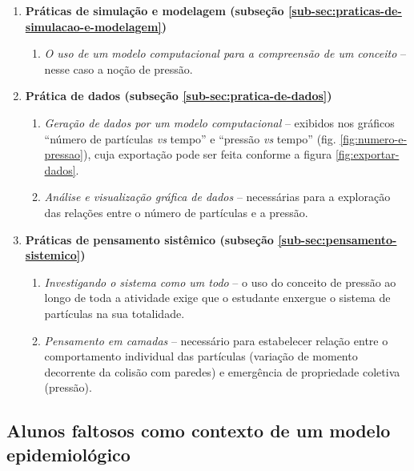 \begin{enumerate}

  \item \textbf{Práticas de simulação e modelagem (subseção \ref{sub-sec:praticas-de-simulacao-e-modelagem})}
    \begin{enumerate}
      \item \textit{O uso de um modelo computacional para a compreensão de um conceito} -- nesse caso a noção de pressão.
    \end{enumerate}

  \item \textbf{Prática de dados (subseção \ref{sub-sec:pratica-de-dados})}
    \begin{enumerate}
      \item \textit{Geração de dados por um modelo computacional} -- exibidos nos gráficos ``número de partículas \textit{vs} tempo'' e ``pressão \textit{vs} tempo'' (fig. \ref{fig:numero-e-pressao}), cuja exportação pode ser feita conforme a figura \ref{fig:exportar-dados}.

      \item \textit{Análise e visualização gráfica de dados} -- necessárias para a exploração das relações entre o número de partículas e a pressão.
    \end{enumerate}

  \item \textbf{Práticas de pensamento sistêmico (subseção \ref{sub-sec:pensamento-sistemico})}

    \begin{enumerate}
      \item \textit{Investigando o sistema como um todo} -- o uso do conceito de pressão ao longo de toda a atividade exige que o estudante enxergue o sistema de partículas na sua totalidade.        
      \item \textit{Pensamento em camadas} -- necessário para estabelecer relação entre o comportamento individual das partículas (variação de momento decorrente da colisão com paredes) e emergência de propriedade coletiva (pressão).
    \end{enumerate}
  
\end{enumerate}

\subsection{Alunos faltosos como contexto de um modelo epidemiológico}

